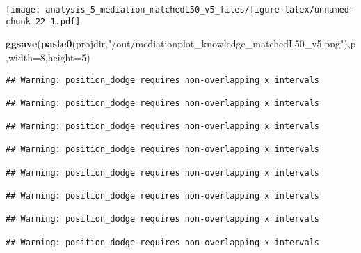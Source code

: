 \documentclass[
]{article}
\newenvironment{Shaded}{\begin{snugshade}}{\end{snugshade}}
\newcommand{\DataTypeTok}[1]{\textcolor[rgb]{0.13,0.29,0.53}{#1}}
\newcommand{\DecValTok}[1]{\textcolor[rgb]{0.00,0.00,0.81}{#1}}
\newcommand{\KeywordTok}[1]{\textcolor[rgb]{0.13,0.29,0.53}{\textbf{#1}}}
\newcommand{\NormalTok}[1]{#1}
\newcommand{\StringTok}[1]{\textcolor[rgb]{0.31,0.60,0.02}{#1}}
\begin{document}
\texttt{[image: analysis\_5\_mediation\_matchedL50\_v5\_files/figure-latex/unnamed-chunk-22-1.pdf]}

\begin{Shaded}
\begin{Highlighting}[]
\KeywordTok{ggsave}\NormalTok{(}\KeywordTok{paste0}\NormalTok{(projdir,}\StringTok{"/out/mediationplot_knowledge_matchedL50_v5.png"}\NormalTok{),p,}\DataTypeTok{width=}\DecValTok{8}\NormalTok{,}\DataTypeTok{height=}\DecValTok{5}\NormalTok{)}
\end{Highlighting}
\end{Shaded}

\begin{verbatim}
## Warning: position_dodge requires non-overlapping x intervals

## Warning: position_dodge requires non-overlapping x intervals

## Warning: position_dodge requires non-overlapping x intervals

## Warning: position_dodge requires non-overlapping x intervals

## Warning: position_dodge requires non-overlapping x intervals

## Warning: position_dodge requires non-overlapping x intervals

## Warning: position_dodge requires non-overlapping x intervals

## Warning: position_dodge requires non-overlapping x intervals
\end{verbatim}
\end{document}
